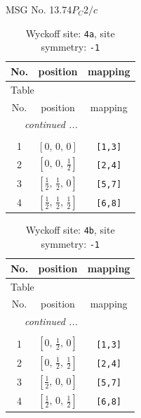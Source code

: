 \documentclass[fleqn,8pt]{jsarticle}
\begin{document}
\setcounter{MaxMatrixCols}{32}

\renewcommand{\tablename}{Table~}
\renewcommand{\figurename}{Figure~}
\begin{center}
\LARGE
MSG No. 13.74\quad$P_{C}2/c$
\end{center}
\renewcommand{\arraystretch}{1.2}
\begin{longtable}{ccc}
\caption{Wyckoff site: {\tt 4a}, site symmetry: {\tt -1}}
 \\
 \hline \hline
No. & position & mapping \\ \hline \endfirsthead

\multicolumn{2}{l}{\tablename\ \thetable{}} \\
 \hline \hline
No. & position & mapping \\ \hline \endhead

 \hline \hline
\multicolumn{2}{r}{\footnotesize\it continued ...} \\ \endfoot

 \hline \hline
\multicolumn{2}{r}{} \\ \endlastfoot

1 & $\left[ 0,\, 0,\, 0 \right]$ & {\tt [1,3]} \\ \hline
2 & $\left[ 0,\, 0,\, \frac{1}{2} \right]$ & {\tt [2,4]} \\ \hline
3 & $\left[ \frac{1}{2},\, \frac{1}{2},\, 0 \right]$ & {\tt [5,7]} \\ \hline
4 & $\left[ \frac{1}{2},\, \frac{1}{2},\, \frac{1}{2} \right]$ & {\tt [6,8]} \\
\end{longtable}
\renewcommand{\arraystretch}{1.2}
\begin{longtable}{ccc}
\caption{Wyckoff site: {\tt 4b}, site symmetry: {\tt -1}}
 \\
 \hline \hline
No. & position & mapping \\ \hline \endfirsthead

\multicolumn{2}{l}{\tablename\ \thetable{}} \\
 \hline \hline
No. & position & mapping \\ \hline \endhead

 \hline \hline
\multicolumn{2}{r}{\footnotesize\it continued ...} \\ \endfoot

 \hline \hline
\multicolumn{2}{r}{} \\ \endlastfoot

1 & $\left[ 0,\, \frac{1}{2},\, 0 \right]$ & {\tt [1,3]} \\ \hline
2 & $\left[ 0,\, \frac{1}{2},\, \frac{1}{2} \right]$ & {\tt [2,4]} \\ \hline
3 & $\left[ \frac{1}{2},\, 0,\, 0 \right]$ & {\tt [5,7]} \\ \hline
4 & $\left[ \frac{1}{2},\, 0,\, \frac{1}{2} \right]$ & {\tt [6,8]} \\
\end{longtable}
\end{document}
